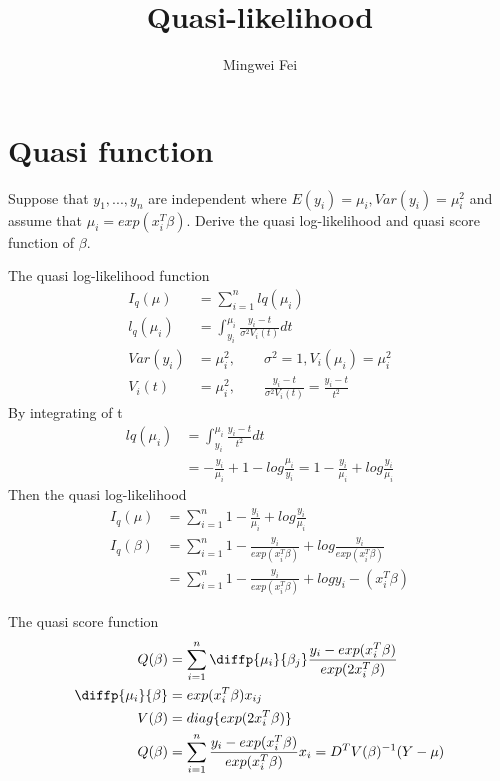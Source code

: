 \documentclass[11pt]{article} %
\title{Quasi-likelihood}
\author{Mingwei Fei}
\begin{document}
\maketitle

\section{Quasi function}
 Suppose that $y_1, ..., y_n$ are independent where $E(y_i)= \mu_i, Var(y_i) = \mu_i^2$ and assume that $\mu_i = exp(x_i^T\beta)$. Derive the quasi log-likelihood and quasi score function of $\beta$.
 
 The quasi log-likelihood function
\begin{align*}
	I_q(\mu) &= \sum_{i=1}^n lq(\mu_i)\\
	l_q(\mu_i) &=\int_{y_i}^{\mu_i} \frac{y_i- t}{\sigma^2 V_i (t)} dt\\
	Var(y_i) &= \mu_i^2,  \qquad \sigma^2 = 1, V_i(\mu_i) = \mu_i^2\\
	V_i (t) &= \mu_i^2, \qquad  \frac{y_i- t}{\sigma^2 V_i (t)} = \frac{y_i - t}{t^2}
\end{align*} 
By integrating of t
\begin{align*}
	lq(\mu_i) &= \int_{y_i}^{\mu_i} \frac{y_i - t}{t^2} dt\\
	&= -\frac{y_i}{\mu_i} + 1 -log \frac{\mu_i}{y_i} = 1- \frac{y_i}{\mu_i} + log \frac{y_i}{\mu_i}
\end{align*} 
Then the quasi log-likelihood
\begin{align*}
	I_q(\mu) &= \sum_{i=1}^n 1- \frac{y_i}{\mu_i} + log \frac{y_i}{\mu_i}\\
	I_q(\beta) &= \sum_{i=1}^n 1- \frac{y_i}{exp(x_i^T\beta)} + log \frac{y_i}{exp(x_i^T\beta)} \\
	&=  \sum_{i=1}^n 1- \frac{y_i}{exp(x_i^T\beta)} + log y_i - {(x_i^T\beta)} 
\end{align*} 

The quasi score function
\begin{align*}
	Q(\beta) &= \sum_{i=1}^n \diffp{\mu_i}{{\beta_j}} \frac{y_i - exp(x_i^T \beta)}{exp(2 x_i^T \beta)} \\
	\diffp{\mu_i}{{\beta}} &= exp( x_i^T \beta) x_{ij} \\
	V(\beta) &= diag \{ exp(2 x_i^T \beta) \} \\
	Q(\beta) &=  \sum_{i=1}^n  \frac{y_i - exp(x_i^T \beta)}{exp( x_i^T \beta)} x_{i} = D^T V(\beta)^{-1} (Y- \mu) 
\end{align*} 
\end{document}
